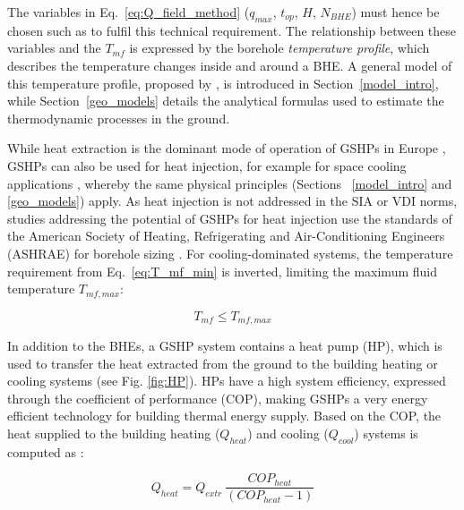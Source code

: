 The variables in Eq.~\ref{eq:Q_field_method} ($q_\mathit{max}$, $t_{op}$, $H$, $N_\mathit{BHE}$) must hence be chosen such as to fulfil this technical requirement.
%
The relationship between these variables and the $T_{mf}$ is expressed by the borehole \textit{temperature profile}, which describes the temperature changes inside and around a BHE.
A general model of this temperature profile, proposed by \citet{claesson_conductive_1988}, is introduced in Section~\ref{model_intro}, while Section~\ref{geo_models} details the analytical formulas used to estimate the thermodynamic processes in the ground.

While heat extraction is the dominant mode of operation of GSHPs in Europe \cite{lund_direct_2020}, GSHPs can also be used for heat injection, for example for space cooling applications \cite{kavanaugh_geothermal_2014}, whereby the same physical principles (Sections ~\ref{model_intro} and \ref{geo_models}) apply.
As heat injection is not addressed in the SIA or VDI norms, studies addressing the potential of GSHPs for heat injection use the standards of the American Society of Heating, Refrigerating and Air-Conditioning Engineers (ASHRAE) \cite{kavanaugh_geothermal_2014} for borehole sizing \cite{aditya_environmental_2020,miglani_methodology_2018,michopoulos_potential_2011} . For cooling-dominated systems, the temperature requirement from Eq.~\ref{eq:T_mf_min} is inverted, limiting the maximum fluid temperature $T_\mathit{mf,max}$:

\begin{equation}
\label{eq:T_mf_max}
T_{mf} \leq T_\mathit{mf,max}
\end{equation}

In addition to the BHEs, a GSHP system contains a heat pump (HP), which is used to transfer the heat extracted from the ground to the building heating or cooling systems (see Fig. \ref{fig:HP}).
HPs have a high system efficiency, expressed through the coefficient of performance (COP), making GSHPs a very energy efficient technology for building thermal energy supply. Based on the COP, the heat supplied to the building heating ($Q_\mathit{heat}$) and cooling ($Q_\mathit{cool}$) systems is computed as \cite{kavanaugh_geothermal_2014}: 

\begin{equation}
\label{eq:COP_heat}
Q_\mathit{heat}=Q_\mathit{extr}\ \frac{COP_\mathit{heat}}{\left(COP_\mathit{heat}-1\right)}
\end{equation}

